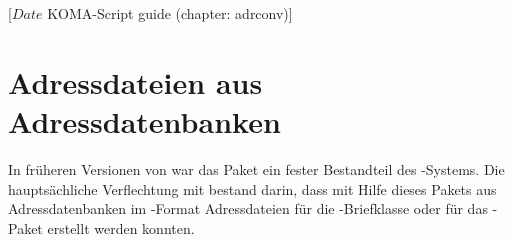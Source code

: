 %
%
%
%
%
%
%
%
% 
%
%
%
%

                 [$Date$
                  KOMA-Script guide (chapter: adrconv)]

\chapter{Adressdateien aus Adressdatenbanken}%
%
%
%

In früheren Versionen von \KOMAScript{} war das Paket
 ein fester Bestandteil des
\KOMAScript{}-Systems.
Die hauptsächliche Verflechtung mit \KOMAScript{}
bestand darin, dass mit Hilfe dieses Pakets aus
Adressdatenbanken im \BibTeX-Format Adressdateien
für die \KOMAScript-Briefklasse oder für das
-Paket erstellt werden konnten.

